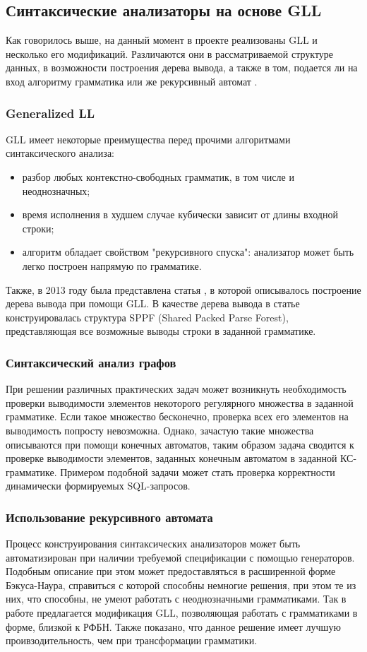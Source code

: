 \documentclass[14pt]{matmex-diploma}
\begin{document}
\subsection{Синтаксические анализаторы на основе GLL}
Как говорилось выше, на данный момент в проекте реализованы GLL и несколько его модификаций. Различаются они в рассматриваемой структуре данных, в возможности построения дерева вывода, а также в том, подается ли на вход алгоритму грамматика или же рекурсивный автомат \cite{RADesc}.

\subsubsection{Generalized LL}
GLL имеет некоторые преимущества перед прочими алгоритмами синтаксического анализа:
\begin{itemize}
    \item разбор любых контекстно-свободных грамматик, в том числе и неоднозначных;
    \item время исполнения в худшем случае кубически зависит от длины входной строки;
    \item алгоритм обладает свойством "рекурсивного спуска": анализатор может быть легко построен напрямую по грамматике.
\end{itemize}
Также, в 2013 году была представлена статья \cite{GLLTreeGen}, в которой описывалось построение дерева вывода при помощи GLL. В качестве дерева вывода в статье конструировалась структура SPPF (Shared Packed Parse Forest), представляющая все возможные выводы строки в заданной грамматике.

\subsubsection{Синтаксический анализ графов}
При решении различных практических задач может возникнуть необходимость проверки выводимости элементов некоторого регулярного множества в заданной грамматике. Если такое множество бесконечно, проверка всех его элементов на выводимость попросту невозможна. Однако, зачастую такие множества описываются при помощи конечных автоматов, таким образом задача сводится к проверке выводимости элементов, заданных конечным автоматом в заданной КС-грамматике. Примером подобной задачи может стать проверка корректности динамически формируемых SQL-запросов.

\subsubsection{Использование рекурсивного автомата}
Процесс конструирования синтаксических анализаторов может быть автоматизирован при наличии требуемой спецификации с помощью генераторов. Подобным описание при этом может предоставляться в расширенной форме Бэкуса-Наура, справиться с которой способны немногие решения, при этом те из них, что способны, не умеют работать с неоднозначными грамматиками. Так в работе \cite{paperFSA} предлагается модификация GLL, позволяющая работать с грамматиками в форме, близкой к РФБН. Также показано, что данное решение имеет лучшую проивзодительность, чем при трансформации грамматики.
\end{document}
